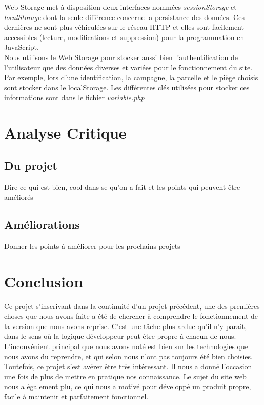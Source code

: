 \documentclass[twoside]{EPURapport}
\begin{document}
		Web Storage met à disposition deux interfaces nommées \emph{sessionStorage} et \emph{localStorage} dont la seule différence concerne la persistance des données. Ces dernières ne sont plus véhiculées sur le réseau HTTP et elles sont facilement accessibles (lecture, modifications et suppression) pour la programmation en JavaScript.\\
		
		Nous utilisons le Web Storage pour stocker aussi bien l'authentification de l'utilisateur que des données diverses et variées pour le fonctionnement du site. Par exemple, lors d'une identification, la campagne, la parcelle et le piège choisis sont stocker dans le localStorage. Les différentes clés utilisées pour stocker ces informations sont dans le fichier \emph{variable.php}

\chapter{Analyse Critique}

	\section{Du projet}
	
	Dire ce qui est bien, cool dans se qu'on a fait et les points qui peuvent être améliorés
	
	\section{Améliorations}
	
	Donner les points à améliorer pour les prochains projets

\chapter{Conclusion}

Ce projet s'inscrivant dans la continuité d'un projet précédent, une des premières choses que nous avons faite a été de chercher à comprendre le fonctionnement de la version que nous avons reprise. C'est une tâche plus ardue qu'il n'y parait, dans le sens où la logique développeur peut être propre à chacun de nous. L'inconvénient principal que nous avons noté est bien sur les technologies que nous avons du reprendre, et qui selon nous n'ont pas toujours été bien choisies.\\

Toutefois, ce projet s'est avérer être très intéressant. Il nous a donné l'occasion une fois de plus de mettre en pratique nos connaissance. Le sujet du site web nous a également plu, ce qui nous a motivé pour développé un produit propre, facile à maintenir et parfaitement fonctionnel.

\annexes
\end{document}
